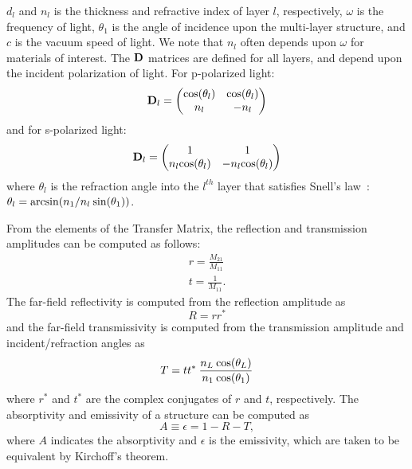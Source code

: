 \documentclass[journal=jpclcd,manuscript=suppinfo]{achemso}
\begin{document}
$d_l$ and $n_l$ is the thickness and refractive index of layer $l$, respectively, 
$\omega$ is the frequency of light, $\theta_1$ is the angle of incidence upon the 
multi-layer structure, and $c$ is the vacuum speed of light.  We note that 
$n_l$ often depends upon $\omega$ for materials of interest.  
The ${\bf D}$ matrices are defined for all layers, and depend upon the incident
polarization of light.  For p-polarized light:
\begin{equation}
{\bf D}_l = 
\begin{pmatrix}
    {\rm cos}(\theta_l)    &     {\rm cos}(\theta_l)   \\
    n_l    &     -n_l   
\end{pmatrix}
\end{equation}
and for s-polarized light:
\begin{equation}
{\bf D}_l = 
\begin{pmatrix}
    1 &     1   \\
    n_l {\rm cos}(\theta_l)    &     -n_l {\rm cos}(\theta_l)    
\end{pmatrix}
\end{equation}
where $\theta_l$ is the refraction angle into the $l^{th}$ layer that satisfies Snell's 
law~\cite{Yeh}: $\theta_l = {\rm arcsin}(n_1/n_l \: {\rm sin}(\theta_1))$.

From the elements of the Transfer Matrix, the reflection and transmission amplitudes
can be computed as follows:
\begin{align}
r = \frac{M_{21}}{M_{11}} \\
t = \frac{1}{M_{11}}.
\end{align}
The far-field reflectivity is computed from the reflection amplitude as
\begin{equation}
R = r r^*
\end{equation}
and the far-field transmissivity is computed from the transmission amplitude and 
incident/refraction angles as 
\begin{equation}
T = t t^* \: \frac{n_L \: {\rm cos}(\theta_L)}{n_1 \: {\rm cos}(\theta_1)}
\end{equation}
where $r^*$ and $t^*$ are the complex conjugates of $r$ and $t$, respectively.
The absorptivity and emissivity of a structure can be computed as
\begin{equation}
A \equiv \epsilon = 1 - R - T,
\end{equation}
where $A$ indicates the absorptivity and $\epsilon$ is the emissivity, which are taken
to be equivalent by Kirchoff's theorem.
\end{document}
